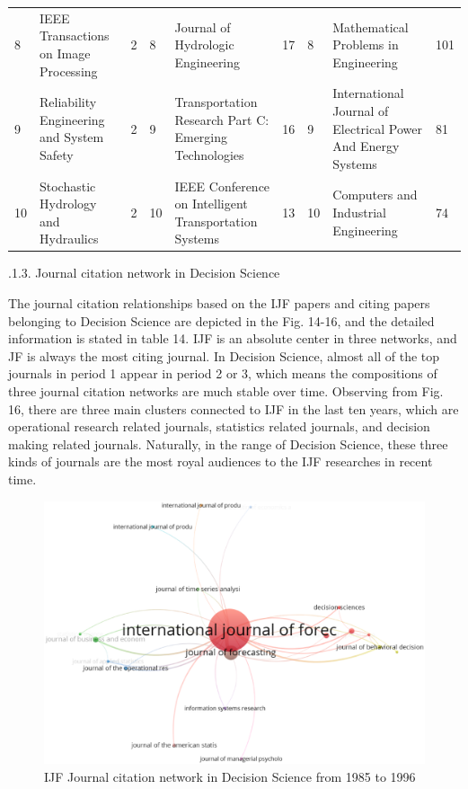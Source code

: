 \documentclass[11pt,a4paper]{elsarticle} %
\begin{document}
\begin{landscape}
\begin{table}[!htbp]
{\begin{tabular}{p{1.5cm}<{\centering} p{6cm}<{\centering} p{1.5cm}<{\centering}|p{1.5cm}<{\centering} p{6cm}<{\centering} p{1.5cm}<{\centering}|p{1.5cm}<{\centering} p{6cm}<{\centering} p{1.5cm}<{\centering}}
   8 & IEEE Transactions on Image Processing & 2 & 8 & Journal of Hydrologic Engineering & 17 & 8 & Mathematical Problems in Engineering & 101\\
   9 & Reliability Engineering and System Safety & 2 & 9 & Transportation Research Part C: Emerging Technologies & 16 & 9 & International Journal of Electrical Power And Energy Systems & 81\\
   10 & Stochastic Hydrology and Hydraulics & 2 & 10 & IEEE Conference on Intelligent Transportation Systems & 13 & 10 & Computers and Industrial Engineering & 74\\
  \hline
  \hline
    \end{tabular}}
\end{table}
\end{landscape}

.1.3. Journal citation network in Decision Science

The journal citation relationships based on the IJF papers and citing
papers belonging to Decision Science are depicted in the Fig. 14-16, and
the detailed information is stated in table 14. IJF is an absolute
center in three networks, and JF is always the most citing journal. In
Decision Science, almost all of the top journals in period 1 appear in
period 2 or 3, which means the compositions of three journal citation
networks are much stable over time. Observing from Fig. 16, there are
three main clusters connected to IJF in the last ten years, which are
operational research related journals, statistics related journals, and
decision making related journals. Naturally, in the range of Decision
Science, these three kinds of journals are the most royal audiences to
the IJF researches in recent time.

\begin{figure}[htbp]
\centering
\includegraphics[scale=0.4]{fig.14.eps}
\caption{IJF Journal citation network in Decision Science from 1985 to 1996}
\end{figure}
\end{document}
